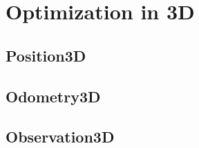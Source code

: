 \section{Optimization in 3D}

\subsection{Position3D}

\subsection{Odometry3D}

\subsection{Observation3D}
